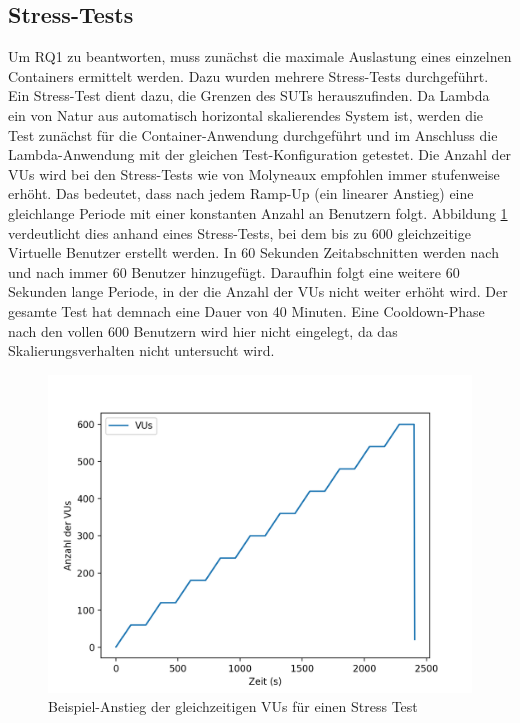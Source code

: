 \subsection{Stress-Tests}
Um RQ1 zu beantworten, muss zunächst die maximale Auslastung eines einzelnen Containers ermittelt werden. Dazu wurden mehrere Stress-Tests durchgeführt. Ein Stress-Test dient dazu, die Grenzen des SUTs herauszufinden. Da Lambda ein von Natur aus automatisch horizontal skalierendes System ist, werden die Test zunächst für die Container-Anwendung durchgeführt und im Anschluss die Lambda-Anwendung mit der gleichen Test-Konfiguration getestet. Die Anzahl der VUs wird bei den Stress-Tests wie von Molyneaux\cite{molyneaux_art_2014} empfohlen immer stufenweise erhöht. Das bedeutet, dass nach jedem Ramp-Up (ein linearer Anstieg) eine gleichlange Periode mit einer konstanten Anzahl an Benutzern folgt. Abbildung \ref{fig:stress-vus-example} verdeutlicht dies anhand eines Stress-Tests, bei dem bis zu 600 gleichzeitige Virtuelle Benutzer erstellt werden. In 60 Sekunden Zeitabschnitten werden nach und nach immer 60 Benutzer hinzugefügt. Daraufhin folgt eine weitere 60 Sekunden lange Periode, in der die Anzahl der VUs nicht weiter erhöht wird. Der gesamte Test hat demnach eine Dauer von 40 Minuten. Eine Cooldown-Phase nach den vollen 600 Benutzern wird hier nicht eingelegt, da das Skalierungsverhalten nicht untersucht wird.

\begin{figure}[H]
    \includegraphics[width=\textwidth]{img/stress-vus-example.png}
    \caption[Beispiel-Anstieg der gleichzeitigen VUs für einen Stress Test]{Beispiel-Anstieg der gleichzeitigen VUs für einen Stress Test}
    \label{fig:stress-vus-example}
\end{figure}

